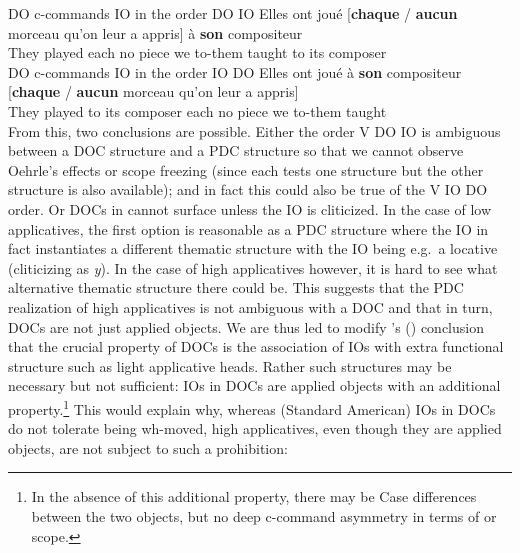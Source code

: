 \documentclass[output=paper]{langsci/langscibook}
\begin{document}
\ea \label{doio26}
\ea  DO c-commands IO in the order DO IO
\sn
\gll Elles ont  jou\'{e} [{\bf chaque} / {\bf aucun} morceau qu'on leur a appris] \`{a} {\bf son} compositeur\\
They {} played  each {} no piece we to-them {} taught to its composer\\
\ex  DO c-commands IO in the order IO DO
\sn
\gll Elles  ont jou\'{e}  \`{a} {\bf son} compositeur [\textbf{chaque} / \textbf{aucun} morceau qu'on leur a appris]\\
They {} played   to its composer each {} no piece we to-them {} taught\\
\z
\z
%
From this, two conclusions are possible. Either the order V DO IO is ambiguous
between a \gls{DOC} structure and a \gls{PDC} structure so that we cannot
observe Oehrle's effects or scope freezing (since each tests one structure but
the other structure is also available); and in fact this could also be true of
the V IO DO order. Or \glspl{DOC} in  cannot surface unless the IO is
cliticized. In the case of low applicatives, the first option is reasonable as
a \gls{PDC} structure where the IO in fact instantiates a different thematic
structure with the IO being e.g.\ a locative (cliticizing as {\it y}). In the
case of high applicatives however, it is hard to see what alternative thematic
structure there could be. This suggests that the \gls{PDC} realization of high
applicatives is not ambiguous with a \gls{DOC} and that in turn, \glspl{DOC}
are not just applied objects. We are thus led to modify
\citeauthor{anagnostopoulou2005cross}'s (\citeyear{anagnostopoulou2005cross})
conclusion that the crucial  property of \glspl{DOC} is  the association of
\glspl{IO} with extra functional structure such  as light applicative heads.
Rather such structures may be necessary but not sufficient: \glspl{IO} in
\glspl{DOC} are applied objects with an additional property.\footnote{In the
absence of this additional property, there may be Case differences between the
two objects, but no deep c-command asymmetry in terms of  or scope.}
This would explain why, whereas (Standard American)  \glspl{IO} in
\glspl{DOC} do not tolerate being wh-moved, high applicatives, even though they
are applied objects, are not subject to such a prohibition:
\end{document}
